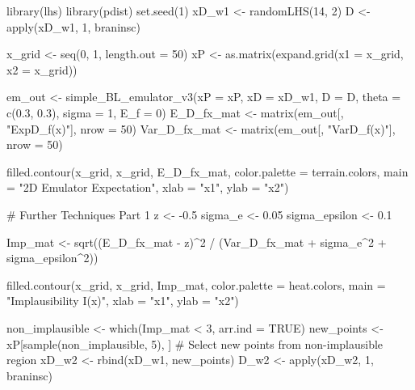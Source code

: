 library(lhs)
library(pdist)
set.seed(1)
xD_w1 <- randomLHS(14, 2)
D <- apply(xD_w1, 1, braninsc)

x_grid <- seq(0, 1, length.out = 50)
xP <- as.matrix(expand.grid(x1 = x_grid, x2 = x_grid))

em_out <- simple_BL_emulator_v3(xP = xP, xD = xD_w1, D = D, theta = c(0.3, 0.3), sigma = 1, E_f = 0)
E_D_fx_mat <- matrix(em_out[, "ExpD_f(x)"], nrow = 50)
Var_D_fx_mat <- matrix(em_out[, "VarD_f(x)"], nrow = 50)

filled.contour(x_grid, x_grid, E_D_fx_mat,
               color.palette = terrain.colors,
               main = "2D Emulator Expectation",
               xlab = "x1", ylab = "x2")

# Further Techniques Part 1
z <- -0.5
sigma_e <- 0.05
sigma_epsilon <- 0.1

Imp_mat <- sqrt((E_D_fx_mat - z)^2 / (Var_D_fx_mat + sigma_e^2 + sigma_epsilon^2))

filled.contour(x_grid, x_grid, Imp_mat,
               color.palette = heat.colors,
               main = "Implausibility I(x)",
               xlab = "x1", ylab = "x2")

non_implausible <- which(Imp_mat < 3, arr.ind = TRUE)
new_points <- xP[sample(non_implausible, 5), ]  # Select new points from non-implausible region
xD_w2 <- rbind(xD_w1, new_points)
D_w2 <- apply(xD_w2, 1, braninsc)